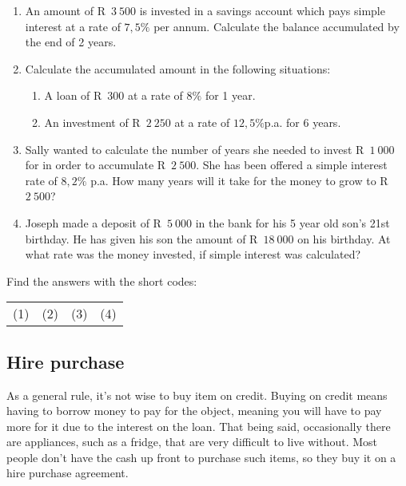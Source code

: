 \begin{exercises}{}{
    \begin{enumerate}[itemsep=6pt, label=\textbf{\arabic*}.]
	\item An amount of R~$3~500$ is invested in a savings account which pays simple interest at a rate of $7,5\%$ per annum. Calculate the balance accumulated by the end of 2 years.

	\item Calculate the accumulated amount in the following situations:
	\begin{enumerate}[noitemsep, label=\textbf{(\alph*)} ]
	    \item A loan of R~$300$ at a rate of $8\%$ for 1 year.

	    \item An investment of R~$2~250$ at a rate of $12,5\%$p.a. for 6 years.
	\end{enumerate}

	\item Sally wanted to calculate the number of years she needed to invest R~$1~000$ for in order to accumulate R~$2~500$. She has been offered a simple interest rate of $8,2\%$ p.a. How many years will it take for the money to grow to R~$2~500$?

	\item Joseph made a deposit of R~$5~000$ in the bank for his 5 year old son’s 21st birthday. He has given his son the amount of R~$18~000$ on his birthday. At what rate was the money invested, if simple interest was calculated?\\
    \end{enumerate}
\practiceinfo
    Find the answers with the short codes:\\
    \begin{tabularx}{\textwidth}{ XXXX }
	(1)	&	(2)	&	(3)	&	(4)\\
    \end{tabularx}
}
\end{exercises}


\subsection{Hire purchase}

As a general rule, it’s not wise to buy item on credit. Buying on credit means having to borrow money to pay for the object, meaning you will have to pay more for it due to the interest on the loan. That being said, occasionally there are appliances, such as a fridge, that are very difficult to live without. Most people don’t have the cash up front to purchase such items, so they buy it on a hire purchase agreement.\par

